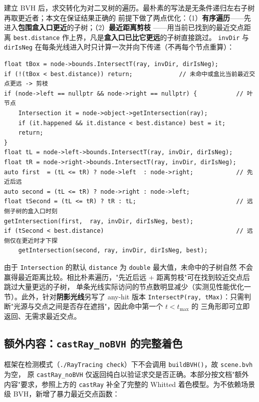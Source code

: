 \documentclass[11pt]{ctexart}
\begin{document}
建立 BVH 后，求交转化为对二叉树的遍历。最朴素的写法是无条件递归左右子树再取更近者；本文在保证结果正确的
前提下做了两点优化：（1）\textbf{有序遍历}——先进入\textbf{包围盒入口更近}的子树；（2）\textbf{最近距离剪枝}
——用当前已找到的最近交点距离 \texttt{best.distance} 作上界，凡是\textbf{盒入口已比它更远}的子树直接跳过。
\texttt{invDir} 与 \texttt{dirIsNeg} 在每条光线进入时只计算一次并向下传递（不再每个节点重算）：

\begin{lstlisting}
float tBox = node->bounds.IntersectT(ray, invDir, dirIsNeg);
if (!(tBox < best.distance)) return;             // 未命中或盒比当前最近交点更远 -> 剪枝
if (node->left == nullptr && node->right == nullptr) {           // 叶节点
    Intersection it = node->object->getIntersection(ray);
    if (it.happened && it.distance < best.distance) best = it;
    return;
}
float tL = node->left->bounds.IntersectT(ray, invDir, dirIsNeg);
float tR = node->right->bounds.IntersectT(ray, invDir, dirIsNeg);
auto first  = (tL <= tR) ? node->left  : node->right;            // 先近后远
auto second = (tL <= tR) ? node->right : node->left;
float tSecond = (tL <= tR) ? tR : tL;                            // 远侧子树的盒入口时刻
getIntersection(first,  ray, invDir, dirIsNeg, best);
if (tSecond < best.distance)                                     // 远侧仅在更近时才下探
    getIntersection(second, ray, invDir, dirIsNeg, best);
\end{lstlisting}

\noindent 由于 \texttt{Intersection} 的默认 \texttt{distance} 为 \texttt{double} 最大值，未命中的子树自然
不会赢得最近距离比较。相比朴素遍历，"先近后远 + 距离剪枝"可在找到较近交点后跳过大量更远的子树，
单条光线实际访问的节点数明显减少（实测见性能优化一节）。此外，针对\textbf{阴影光线}另写了 any-hit 版本
\texttt{IntersectP(ray, tMax)}：只需判断"光源与交点之间是否存在遮挡"，因此命中第一个 $t<t_{\max}$ 的
三角形即可立即返回、无需求最近交点。

\subsection{额外内容：\texttt{castRay\_noBVH} 的完整着色}

框架在检测模式（\texttt{./RayTracing check}）下不会调用 \texttt{buildBVH()}，故 \texttt{scene.bvh} 为空，
原 \texttt{castRay\_noBVH} 仅返回纯白以验证求交是否正确。本部分按文档"额外内容"要求，参照上方的
\texttt{castRay} 补全了完整的 Whitted 着色模型。为不依赖场景级 BVH，新增了暴力最近交点函数：
\end{document}
